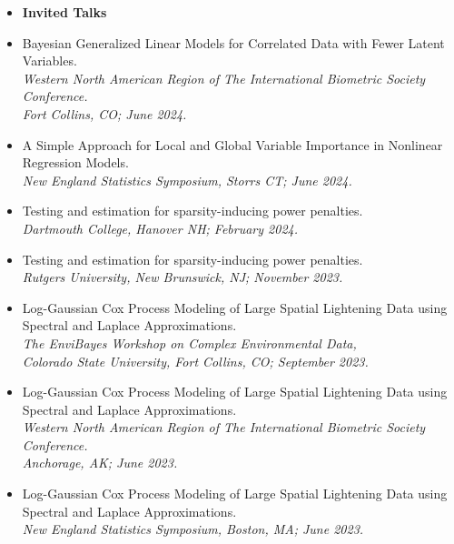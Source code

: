 \documentclass[11pt]{article}
\newcommand{\tab}{\hspace*{2em}}
\begin{document}
\begin{itemize}
	\item[] \textbf{Invited Talks} \vspace{-2mm}
	\item[] Bayesian Generalized Linear Models for Correlated Data with Fewer Latent Variables. \\
	\tab \emph{Western North American Region of The International Biometric Society Conference.} \\
	\tab \emph{Fort Collins, CO; June 2024.}\vspace{-2mm}
	\item[] A Simple Approach for Local and Global Variable Importance in Nonlinear Regression Models. \\
	\tab \emph{New England Statistics Symposium, Storrs CT; June 2024.}\vspace{-2mm}
	\item[] Testing and estimation for sparsity-inducing power penalties. \\
	\tab \emph{Dartmouth College, Hanover NH; February 2024.}\vspace{-2mm}
	\item[] Testing and estimation for sparsity-inducing power penalties. \\
	\tab \emph{Rutgers University, New Brunswick, NJ; November 2023.}\vspace{-2mm}
	\item[] Log-Gaussian Cox Process Modeling of Large Spatial Lightening Data using Spectral and Laplace Approximations. \\
	\tab \emph{The EnviBayes Workshop on Complex Environmental Data,} \\
	\tab \emph{Colorado State University, Fort Collins, CO; September 2023.}\vspace{-2mm}
	\item[] Log-Gaussian Cox Process Modeling of Large Spatial Lightening Data using Spectral and Laplace Approximations. \\
	\tab \emph{Western North American Region of The International Biometric Society Conference.} \\
	\tab \emph{Anchorage, AK; June 2023.}\vspace{-2mm}
	\item[] Log-Gaussian Cox Process Modeling of Large Spatial Lightening Data using Spectral and Laplace Approximations. \\
	\tab \emph{New England Statistics Symposium, Boston, MA; June 2023.}\vspace{-2mm}

\end{itemize}
\end{document}
